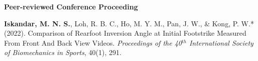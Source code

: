 \documentclass[../main.tex]{subfiles}
\begin{document}
        \textbf{Peer-reviewed Conference Proceeding}
        \def\labelprefix{C}
        \begin{etaremune}
            \item\label{conference: isbs2022} {\textbf{Iskandar, M. N. S.}, Loh, R. B. C., Ho, M. Y. M., Pan, J. W., \& Kong, P. W.* (2022). Comparison of Rearfoot Inversion Angle at Initial Footstrike Measured From Front And Back View Videos. \textit{Proceedings of the 40$^{th}$ International Society of Biomechanics in Sports}, 40(1), 291. \href{https://commons.nmu.edu/isbs/vol40/iss1/70/}{\faFilePdfO}}
        \end{etaremune}

            

            
        
\end{document}
